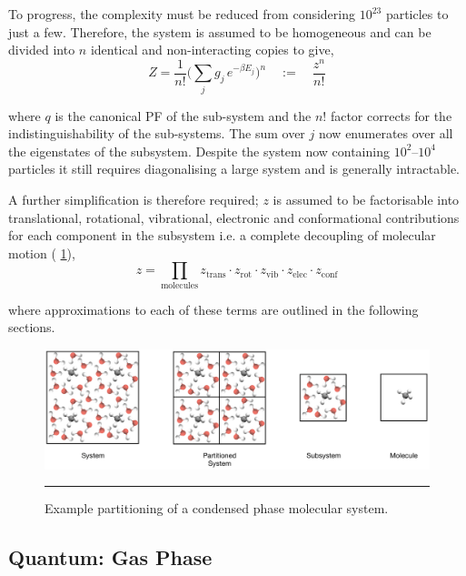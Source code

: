 \documentclass[../main.tex]{subfiles}
\begin{document}
To progress, the complexity must be reduced from considering $10^{23}$ particles to just a few. Therefore, the system is assumed to be homogeneous and can be divided into $n$ identical and non-interacting copies to give,
\begin{equation}
Z = \frac{1}{n!} {\Big (} \sum_j g_j \, e^{-\beta E_j} {\Big )}^n \quad := \quad \frac{z^n}{n!}
\label{Z_partion_q}
\end{equation}

where $q$ is the canonical PF of the sub-system and the $n!$ factor corrects for the indistinguishability of the sub-systems. The sum over $j$ now enumerates over all the eigenstates of the subsystem. Despite the system now containing $10^2$--$10^4$ particles it still requires diagonalising a large system and is generally intractable.

A further simplification is therefore required; $z$ is assumed to be factorisable into translational, rotational, vibrational, electronic and conformational contributions for each component in the subsystem i.e. a complete decoupling of molecular motion (\figurename{ \ref{fig::entropy_X1}}),
\begin{equation}
z = \prod_{\text{molecules}} z_\text{trans} \cdot z_\text{rot} \cdot z_\text{vib} \cdot z_\text{elec} \cdot z_\text{conf}
\label{equation::subsystem_pf}
\end{equation}

where approximations to each of these terms are outlined in the following sections.

\begin{figure}[h!]
	\centering
	\includegraphics[width=\textwidth]{4/figs/figX1/systems_methane_in_h2o.png}
	\vspace{0.2cm}
	\hrule
	\caption{Example partitioning of a condensed phase molecular system.}
	\label{fig::entropy_X1}
\end{figure}



\subsection{Quantum: Gas Phase}
\end{document}
